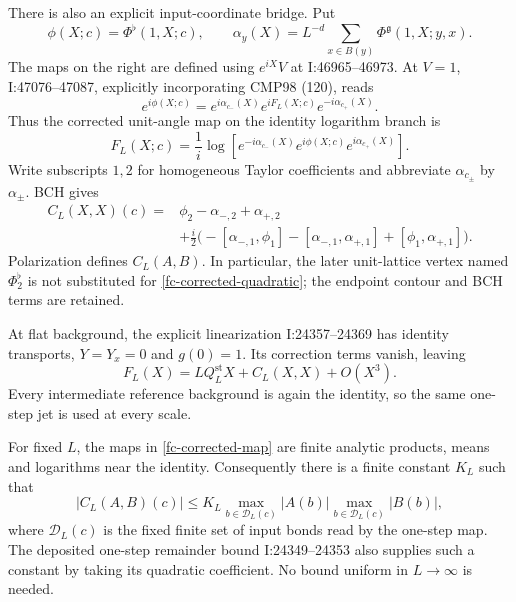 There is also an explicit input-coordinate bridge. Put
\[
 \phi(X;c)=\Phi^{\flat}(1,X;c),\qquad
 \alpha_y(X)=L^{-d}\sum_{x\in B(y)}
                  \Phi^{\mathfrak g}(1,X;y,x).
\]
The maps on the right are defined using $e^{iX}V$ at
I:46965--46973. At $V=1$, I:47076--47087, explicitly incorporating
CMP98 (120), reads
\[
 e^{i\phi(X;c)}=e^{i\alpha_{c_-}(X)}e^{iF_L(X;c)}
                                  e^{-i\alpha_{c_+}(X)}.
\]
Thus the corrected unit-angle map on the identity logarithm branch is
\begin{equation}
 F_L(X;c)=\frac1i\log\!\left[
 e^{-i\alpha_{c_-}(X)}e^{i\phi(X;c)}e^{i\alpha_{c_+}(X)}\right].
 \label{fc-corrected-map}
\end{equation}
Write subscripts $1,2$ for homogeneous Taylor coefficients and
abbreviate $\alpha_{c_\pm}$ by $\alpha_\pm$. BCH gives
\begin{equation}
 \begin{split}
 C_L(X,X)(c)={}&\phi_2-\alpha_{-,2}+\alpha_{+,2}\\
 &+\frac i2\bigl(-[\alpha_{-,1},\phi_1]
                 -[\alpha_{-,1},\alpha_{+,1}]
                 +[\phi_1,\alpha_{+,1}]\bigr).
 \end{split}
 \label{fc-corrected-quadratic}
\end{equation}
Polarization defines $C_L(A,B)$. In particular, the later
unit-lattice vertex named $\Phi^{\flat}_2$ is not substituted for
\eqref{fc-corrected-quadratic}; the endpoint contour and BCH terms
are retained.

At flat background, the explicit linearization I:24357--24369 has
identity transports, $Y=Y_x=0$ and $g(0)=1$. Its correction terms
vanish, leaving
\begin{equation}
 F_L(X)=LQ_L^{\mathrm{st}}X+C_L(X,X)+O(X^3).
 \label{fc-unit-jet}
\end{equation}
Every intermediate reference background is again the identity, so
the same one-step jet is used at every scale.

For fixed $L$, the maps in \eqref{fc-corrected-map} are finite
analytic products, means and logarithms near the identity.
Consequently there is a finite constant $K_L$ such that
\begin{equation}
 |C_L(A,B)(c)|\le K_L
       \max_{b\in\mathcal D_L(c)}|A(b)|
       \max_{b\in\mathcal D_L(c)}|B(b)|,
 \label{fc-one-step-coefficient}
\end{equation}
where $\mathcal D_L(c)$ is the fixed finite set of input bonds read
by the one-step map. The deposited one-step remainder bound
I:24349--24353 also supplies such a constant by taking its quadratic
coefficient. No bound uniform in $L\to\infty$ is needed.

